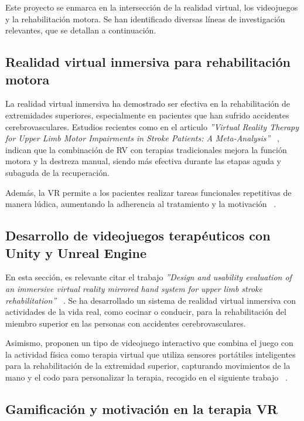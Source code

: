
Este proyecto se enmarca en la intersección de la realidad virtual, los videojuegos y la rehabilitación motora. Se han identificado diversas líneas de investigación relevantes, que se detallan a continuación.

\subsection{Realidad virtual inmersiva para rehabilitación motora}

La realidad virtual inmersiva ha demostrado ser efectiva en la rehabilitación de extremidades superiores, especialmente en pacientes que han sufrido accidentes cerebrovasculares. Estudios recientes como en el articulo \textit{''Virtual Reality Therapy for Upper Limb Motor Impairments in Stroke Patients: A Meta-Analysis'' }~\cite{vr_meta_stroke2024}, indican que la combinación de RV con terapias tradicionales mejora la función motora y la destreza manual, siendo más efectiva durante las etapas aguda y subaguda de la recuperación.

Además, la VR permite a los pacientes realizar tareas funcionales repetitivas de manera lúdica, aumentando la adherencia al tratamiento y la motivación ~\cite{vr_upper_extremity2023}.

\subsection{Desarrollo de videojuegos terapéuticos con Unity y Unreal Engine}

En esta sección, es relevante citar el trabajo \textit{''Design and usability evaluation of an immersive virtual reality mirrored hand system for upper limb stroke rehabilitation'' }~\cite{mirrored_hand_system2025}. Se ha desarrollado un sistema de realidad virtual inmersiva con actividades de la vida real, como cocinar o conducir, para la rehabilitación del miembro superior en las personas con accidentes cerebrovasculares.

Asimismo, proponen un tipo de videojuego interactivo que combina el juego con la actividad física como terapia virtual que utiliza sensores portátiles inteligentes para la rehabilitación de la extremidad superior, capturando movimientos de la mano y el codo para personalizar la terapia, recogido en el siguiente trabajo ~\cite{exergame_sensors2023}.

\subsection{Gamificación y motivación en la terapia VR}

